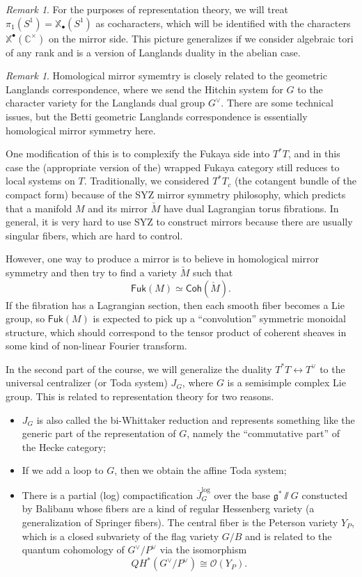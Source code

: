 \documentclass{amsart}
\theoremstyle{definition}
\theoremstyle{remark}
\newtheorem{rmk}[thm]{Remark}
\theoremstyle{plain}
\theoremstyle{definition}
\theoremstyle{remark}
\newcommand{\C}{\mathbb{C}}
\newcommand{\g}{\mathfrak{g}}
\newcommand{\mc}[1]{\mathcal{#1}}
\newcommand{\ms}[1]{\mathsf{#1}}
\newcommand{\ol}[1]{\overline{#1}}
\newcommand{\1}{\mathbf{1}}
\newcommand{\2}{\mathbf{2}}
\newcommand{\3}{\mathbf{3}}
\begin{document}
\begin{rmk}
    For the purposes of representation theory, we will treat \(\pi_1(S^1) = \mathbb{X}_{\bullet}(S^1)\) as cocharacters, which will be identified with the characters \(\mathbb{X}^{\bullet}(\C^{\times})\) on the mirror side. This picture generalizes if we consider algebraic tori of any rank and is a version of Langlands duality in the abelian case.
\end{rmk}

\begin{rmk}
    Homological mirror symemtry is closely related to the geometric Langlands correspondence, where we send the Hitchin system for \(G\) to the character variety for the Langlands dual group \(G^{\vee}\). There are some technical issues, but the Betti geometric Langlands correspondence is essentially homological mirror symmetry here.
\end{rmk}

One modification of this is to complexify the Fukaya side into \(T^* T\), and in this case the (appropriate version of the) wrapped Fukaya category  still reduces to local systems on \(T\). Traditionally, we considered \(T^* T_c\) (the cotangent bundle of the compact form) because of the SYZ mirror symmetry philosophy, which predicts that a manifold \(M\) and its mirror \(\check{M}\) have dual Lagrangian torus fibrations. In general, it is very hard to use SYZ to construct mirrors because there are usually singular fibers, which are hard to control.

However, one way to produce a mirror is to believe in homological mirror symmetry and then try to find a variety \(\check{M}\) such that
\[ \ms{Fuk}(M) \simeq \ms{Coh}(\check{M}). \]
If the fibration has a Lagrangian section, then each smooth fiber becomes a Lie group, so \(\ms{Fuk}(M)\) is expected to pick up a ``convolution'' symmetric monoidal structure, which should correspond to the tensor product of coherent sheaves in some kind of non-linear Fourier transform.

In the second part of the course, we will generalize the duality \(T^*T \leftrightarrow T^{\vee}\) to the universal centralizer (or Toda system) \(J_G\), where \(G\) is a semisimple complex Lie group. This is related to representation theory for two reasons.
\begin{itemize}
    \item \(J_G\) is also called the bi-Whittaker reduction and represents something like the generic part of the representation of \(G\), namely the ``commutative part'' of the Hecke category;
    \item If we add a loop to \(G\), then we obtain the affine Toda system;
    \item There is a partial (log) compactification \(\ol{J}_G^{\log}\) over the base \(\g^* \sslash G\) constucted by Balibanu whose fibers are a kind of regular Hessenberg variety (a generalization of Springer fibers). The central fiber is the Peterson variety \(Y_P\), which is a closed subvariety of the flag variety \(G/B\) and is related to the quantum cohomology of \(G^{\vee}/P^{\vee}\) via the isomorphism
    \[ QH^*(G^{\vee} / P^{\vee}) \cong \mc{O}(Y_P). \]
\end{itemize}
\end{document}
